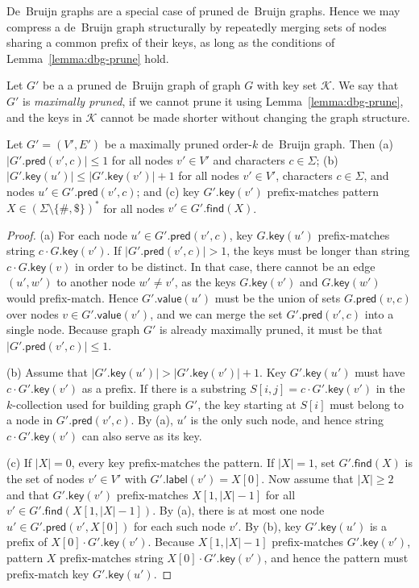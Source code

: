 \documentclass[a4paper,UKenglish]{lipics-v2016}
\newcommand{\set}[1]{\ensuremath{\{ #1 \}}}
\newcommand{\abs}[1]{\ensuremath{\lvert #1 \rvert}}
\newcommand{\find}{\ensuremath{\mathsf{find}}}
\newcommand{\glabel}{\ensuremath{\mathsf{label}}}
\newcommand{\gpred}{\ensuremath{\mathsf{pred}}}
\newcommand{\gkey}{\ensuremath{\mathsf{key}}}
\newcommand{\gvalue}{\ensuremath{\mathsf{value}}}
\newcommand{\kcollection}[1]{$#1$\nobreakdash-collection}
\newcommand{\orderk}[1]{order\nobreakdash-$#1$}
\begin{document}
De~Bruijn graphs are a special case of pruned de~Bruijn graphs. Hence we may compress a de~Bruijn graph structurally by repeatedly merging sets of nodes sharing a common prefix of their keys, as long as the conditions of Lemma~\ref{lemma:dbg-prune} hold.

\begin{definition}
Let $G'$ be a a pruned de~Bruijn graph of graph $G$ with key set $\mathcal{K}$. We say that $G'$ is \emph{maximally pruned}, if we cannot prune it using Lemma~\ref{lemma:dbg-prune}, and the keys in $\mathcal{K}$ cannot be made shorter without changing the graph structure.
\end{definition}

\begin{lemma}\label{lemma:dbg-maximal}
Let $G' = (V', E')$ be a maximally pruned \orderk{k} de~Bruijn graph. Then
(a) $\abs{G'.\gpred(v', c)} \le 1$ for all nodes $v' \in V'$ and characters $c \in \Sigma$;
(b) $\abs{G'.\gkey(u')} \le \abs{G'.\gkey(v')}+1$ for all nodes $v' \in V'$, characters $c \in \Sigma$, and nodes $u' \in G'.\gpred(v', c)$; and
(c) key $G'.\gkey(v')$ prefix-matches pattern $X \in (\Sigma \setminus \set{\#, \$})^{\ast}$ for all nodes $v' \in G'.\find(X)$.
\end{lemma}

\begin{proof}
(a) For each node $u' \in G'.\gpred(v', c)$, key $G.\gkey(u')$ prefix-matches string $c \cdot G.\gkey(v')$. If $\abs{G'.\gpred(v', c)} > 1$, the keys must be longer than string $c \cdot G.\gkey(v)$ in order to be distinct. In that case, there cannot be an edge $(u', w')$ to another node $w' \ne v'$, as the keys $G.\gkey(v')$ and $G.\gkey(w')$ would prefix-match. Hence $G'.\gvalue(u')$ must be the union of sets $G.\gpred(v, c)$ over nodes $v \in G'.\gvalue(v')$, and we can merge the set $G'.\gpred(v', c)$ into a single node. Because graph $G'$ is already maximally pruned, it must be that $\abs{G'.\gpred(v', c)} \le 1$.

(b) Assume that $\abs{G'.\gkey(u')} > \abs{G'.\gkey(v')}+1$. Key $G'.\gkey(u')$ must have $c \cdot G'.\gkey(v')$ as a prefix. If there is a substring $S[i,j] = c \cdot G'.\gkey(v')$ in the \kcollection{k} used for building graph $G'$, the key starting at $S[i]$ must belong to a node in $G'.\gpred(v', c)$. By (a), $u'$ is the only such node, and hence string $c \cdot G'.\gkey(v')$ can also serve as its key.

(c) If $\abs{X} = 0$, every key prefix-matches the pattern. If $\abs{X} = 1$, set $G'.\find(X)$ is the set of nodes $v' \in V'$ with $G'.\glabel(v') = X[0]$. Now assume that $\abs{X} \ge 2$ and that $G'.\gkey(v')$ prefix-matches $X[1, \abs{X}-1]$ for all $v' \in G'.\find(X[1, \abs{X}-1])$. By (a), there is at most one node $u' \in G'.\gpred(v', X[0])$ for each such node $v'$. By (b), key $G'.\gkey(u')$ is a prefix of $X[0] \cdot G'.\gkey(v')$. Because $X[1, \abs{X}-1]$ prefix-matches $G'.\gkey(v')$, pattern $X$ prefix-matches string $X[0] \cdot G'.\gkey(v')$, and hence the pattern must prefix-match key $G'.\gkey(u')$.
\end{proof}
\end{document}
